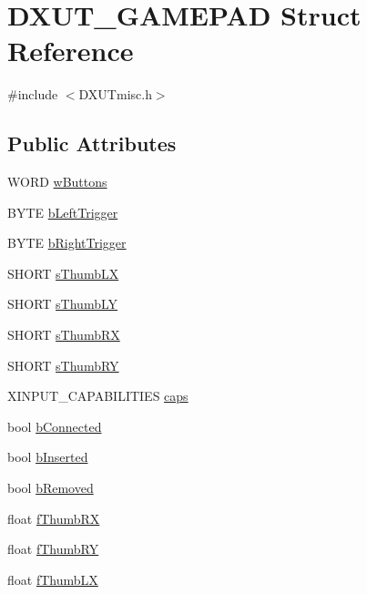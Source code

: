 \hypertarget{struct_d_x_u_t___g_a_m_e_p_a_d}{
\section{DXUT\_\-GAMEPAD Struct Reference}
\label{struct_d_x_u_t___g_a_m_e_p_a_d}
}


{\ttfamily \#include $<$DXUTmisc.h$>$}\subsection*{Public Attributes}
\begin{DoxyCompactItemize}
\item 
WORD \hyperlink{struct_d_x_u_t___g_a_m_e_p_a_d_a1702c0bfaef670a3e369c19e76bd1365}{wButtons}
\item 
BYTE \hyperlink{struct_d_x_u_t___g_a_m_e_p_a_d_afad6b4182e7931e91b32609421f49354}{bLeftTrigger}
\item 
BYTE \hyperlink{struct_d_x_u_t___g_a_m_e_p_a_d_aeb5863b24560130cbdad6f78701bffa3}{bRightTrigger}
\item 
SHORT \hyperlink{struct_d_x_u_t___g_a_m_e_p_a_d_a5239a39fa77f6bfafc450d28e1a4093f}{sThumbLX}
\item 
SHORT \hyperlink{struct_d_x_u_t___g_a_m_e_p_a_d_acbfdf3ef4e244cdc704b6b650445c174}{sThumbLY}
\item 
SHORT \hyperlink{struct_d_x_u_t___g_a_m_e_p_a_d_a7bf9e0a51d076380d372297c6ea2d8ca}{sThumbRX}
\item 
SHORT \hyperlink{struct_d_x_u_t___g_a_m_e_p_a_d_adbe2348a62eff5447e97210b747e700a}{sThumbRY}
\item 
XINPUT\_\-CAPABILITIES \hyperlink{struct_d_x_u_t___g_a_m_e_p_a_d_adb9683d085018a0e2b3b23520b897eab}{caps}
\item 
bool \hyperlink{struct_d_x_u_t___g_a_m_e_p_a_d_ab5bf1de281e3e8676608b965865846d0}{bConnected}
\item 
bool \hyperlink{struct_d_x_u_t___g_a_m_e_p_a_d_ace33cf229d494dd25bcc2cb083ac7ccb}{bInserted}
\item 
bool \hyperlink{struct_d_x_u_t___g_a_m_e_p_a_d_a07b7bc5fd160b506c7fcb023b6f63c1a}{bRemoved}
\item 
float \hyperlink{struct_d_x_u_t___g_a_m_e_p_a_d_a609d623a10b358ff63a39f604f4f5ae7}{fThumbRX}
\item 
float \hyperlink{struct_d_x_u_t___g_a_m_e_p_a_d_ac2abaa5627b4b6ad740e8be222e0a06e}{fThumbRY}
\item 
float \hyperlink{struct_d_x_u_t___g_a_m_e_p_a_d_af8e07f7337fdcf0bca71db0ebdf91144}{fThumbLX}

\end{DoxyCompactItemize}
